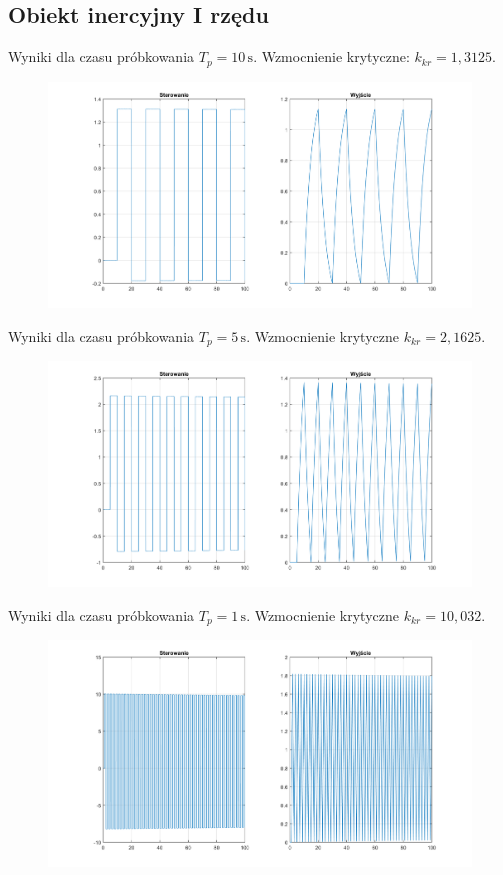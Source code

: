 \documentclass[a4paper, 12pt]{article}
\begin{document}
		\subsection{Obiekt inercyjny I rzędu}
			Wyniki dla czasu próbkowania $T_p = 10 \, \mathrm{s}$. Wzmocnienie krytyczne: $k_{kr} = 1,3125$.
			\begin{figure}[H]
				\centering
				\includegraphics[width = \textwidth]{./img/jedno_k_1_3125.png}
			\end{figure}
			\noindent Wyniki dla czasu próbkowania $T_p = 5 \, \mathrm{s}$. Wzmocnienie krytyczne $k_{kr} = 2,1625$.
			\begin{figure}[H]
				\centering
				\includegraphics[width = \textwidth]{./img/jedno_k_2_1625.png}
			\end{figure}
			\newpage
			\noindent Wyniki dla czasu próbkowania $T_p = 1 \, \mathrm{s}$. Wzmocnienie krytyczne $k_{kr} = 10,032$.
			\begin{figure}[H]
				\centering
				\includegraphics[width = \textwidth]{./img/jedno_k_10_032.png}
			\end{figure}
\end{document}
